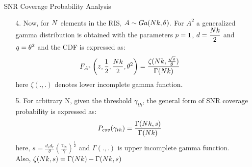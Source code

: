 \documentclass{beamer}
\begin{document}
\begin{frame}{SNR Coverage Probability Analysis}
    \begin{block}{}
        \begin{enumerate}
            \item [4.]\small{Now, for $\mathnormal{N}$ elements in the RIS, $\mathnormal{A} \sim \mathnormal{Ga(Nk,\theta)}$.
            For $A^2$ a generalized gamma distribution is obtained with the parameters $\mathnormal{p} = 1$, $\mathnormal{d} = \dfrac{\mathnormal{Nk}}{2}$ and $\mathnormal{q} = \theta^2$ and the CDF is expressed as:}
            \begin{align}
                \mathnormal{F_{A^2}}\left(z,\frac{1}{2},\frac{\mathnormal{Nk}}{2},\theta^2\right) &= \frac{\zeta(\mathnormal{Nk},\frac{\sqrt{z}}{\theta})}{\Gamma(\mathnormal{Nk})}
            \end{align}
            here $\zeta(.,.)$ denotes lower incomplete gamma function.
            \item [5.]For arbitrary N, given the threshold $\gamma_{th}$, the general form of SNR coverage probability is expressed as:
            \begin{align}
                \mathnormal{P}_{cov}(\gamma_{th}) &= \frac{\Gamma(\mathnormal{Nk,s})}{\Gamma(\mathnormal{Nk})}
            \end{align}
            here, $s = \frac{d_sd_r}{\theta}\left(\frac{\gamma_{th}}{\bar\gamma}\right)^{\frac{1}{2}}$ and $\Gamma(.,.)$ is upper incomplete gamma function.\\
            Also, $\zeta(\mathnormal{Nk,s}) = \Gamma(\mathnormal{Nk}) - \Gamma(\mathnormal{Nk,s})$
        \end{enumerate}
    \end{block}
\end{frame}
\end{document}
